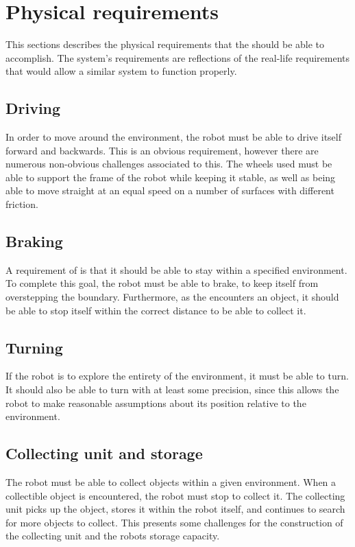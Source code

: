 \section{Physical requirements} \label{sec:physical_requirements}
This sections describes the physical requirements that the \projname{} should be able to accomplish. The system's requirements are reflections of the real-life requirements that would allow a similar system to function properly. 

\subsection{Driving}
In order to move around the environment, the robot must be able to drive itself forward and backwards. This is an obvious requirement, however there are numerous non-obvious challenges associated to this. The wheels used must be able to support the frame of the robot while keeping it stable, as well as being able to move straight at an equal speed on a number of surfaces with different friction.

\subsection{Braking}
A requirement of \projname{} is that it should be able to stay within a specified environment. To complete this goal, the robot must be able to brake, to keep itself from overstepping the boundary. Furthermore, as the \projname{} encounters an object, it should be able to stop itself within the correct distance to be able to collect it.

\subsection{Turning}
If the robot is to explore the entirety of the environment, it must be able to turn. It should also be able to turn with at least some precision, since this allows the robot to make reasonable assumptions about its position relative to the environment. 

\subsection{Collecting unit and storage}
The robot must be able to collect objects within a given environment. When a collectible object is encountered, the robot must stop to collect it. The collecting unit picks up the object, stores it within the robot itself, and continues to search for more objects to collect. This presents some challenges for the construction of the collecting unit and the robots storage capacity.

